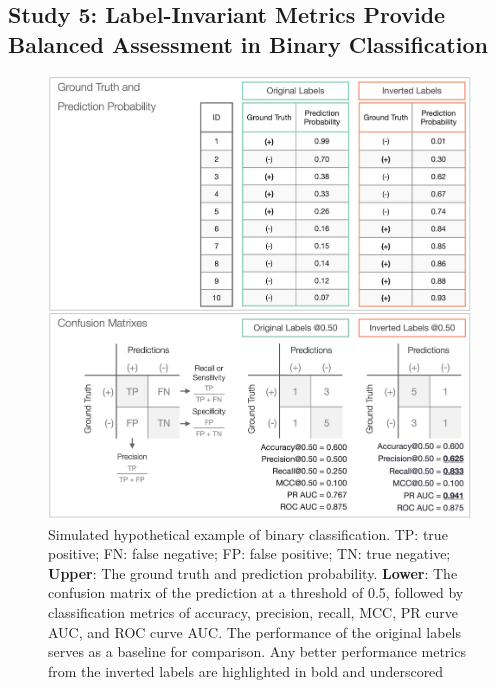 \subsection{Study 5: Label-Invariant Metrics Provide Balanced Assessment in Binary Classification}

\begin{figure}[h]
    \centering
    \includegraphics[width=.8\textwidth]{fig_s5_cls.jpg}
    \caption{Simulated hypothetical example of binary classification. TP: true positive; FN: false negative; FP: false positive; TN: true negative; \textbf{Upper}: The ground truth and prediction probability. \textbf{Lower}: The confusion matrix of the prediction at a threshold of 0.5, followed by classification metrics of accuracy, precision, recall, MCC, PR curve AUC, and ROC curve AUC. The performance of the original labels serves as a baseline for comparison. Any better performance metrics from the inverted labels are highlighted in bold and underscored}
    \label{fig:s5_cls}
\end{figure}


